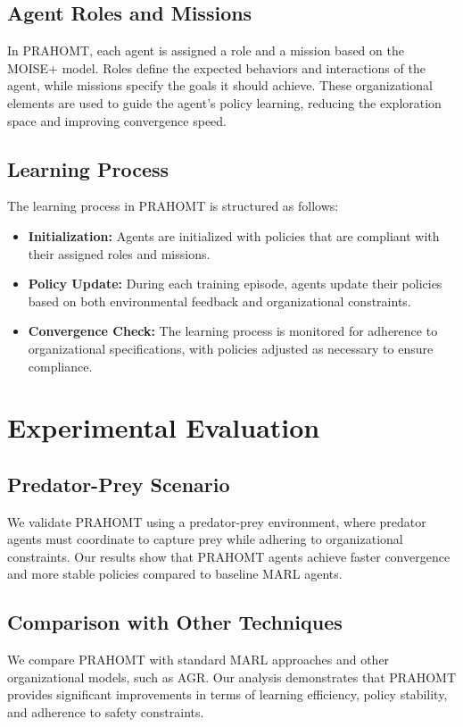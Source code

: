 \documentclass{article}
\begin{document}
\subsection{Agent Roles and Missions}
In PRAHOMT, each agent is assigned a role and a mission based on the MOISE+ model. Roles define the expected behaviors and interactions of the agent, while missions specify the goals it should achieve. These organizational elements are used to guide the agent's policy learning, reducing the exploration space and improving convergence speed.

\subsection{Learning Process}
The learning process in PRAHOMT is structured as follows:
\begin{itemize}
    \item \textbf{Initialization:} Agents are initialized with policies that are compliant with their assigned roles and missions.
    \item \textbf{Policy Update:} During each training episode, agents update their policies based on both environmental feedback and organizational constraints.
    \item \textbf{Convergence Check:} The learning process is monitored for adherence to organizational specifications, with policies adjusted as necessary to ensure compliance.
\end{itemize}

\section{Experimental Evaluation}
\subsection{Predator-Prey Scenario}
We validate PRAHOMT using a predator-prey environment, where predator agents must coordinate to capture prey while adhering to organizational constraints. Our results show that PRAHOMT agents achieve faster convergence and more stable policies compared to baseline MARL agents.

\subsection{Comparison with Other Techniques}
We compare PRAHOMT with standard MARL approaches and other organizational models, such as AGR. Our analysis demonstrates that PRAHOMT provides significant improvements in terms of learning efficiency, policy stability, and adherence to safety constraints.
\end{document}
